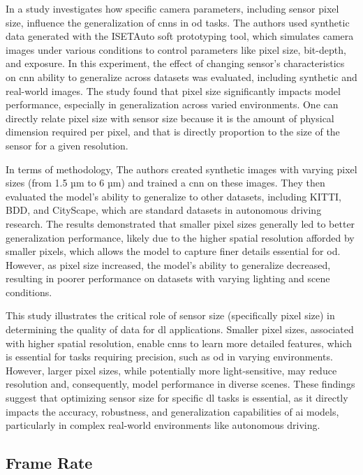 In a study \cite{Sensor_size} investigates how specific camera parameters, including sensor pixel size, influence the generalization of \gls{cnn}s in \gls{od} tasks. The authors used synthetic data generated with the ISETAuto soft prototyping tool, which simulates camera images under various conditions to control parameters like pixel size, bit-depth, and exposure. In this experiment, the effect of changing sensor's characteristics on \gls{cnn} ability to generalize across datasets was evaluated, including synthetic and real-world images. The study found that pixel size significantly impacts model performance, especially in generalization across varied environments. One can directly relate pixel size with sensor size because it is the amount of physical dimension required per pixel, and that is directly proportion to the size of the sensor for a given resolution.

In terms of methodology, The authors created synthetic images with varying pixel sizes (from 1.5 µm to 6 µm) and trained a \gls{cnn} on these images. They then evaluated the model’s ability to generalize to other datasets, including KITTI, BDD, and CityScape, which are standard datasets in autonomous driving research. The results demonstrated that smaller pixel sizes generally led to better generalization performance, likely due to the higher spatial resolution afforded by smaller pixels, which allows the model to capture finer details essential for \gls{od}. However, as pixel size increased, the model’s ability to generalize decreased, resulting in poorer performance on datasets with varying lighting and scene conditions.

This study illustrates the critical role of sensor size (specifically pixel size) in determining the quality of data for \gls{dl} applications. Smaller pixel sizes, associated with higher spatial resolution, enable \gls{cnn}s to learn more detailed features, which is essential for tasks requiring precision, such as \gls{od} in varying environments. However, larger pixel sizes, while potentially more light-sensitive, may reduce resolution and, consequently, model performance in diverse scenes. These findings suggest that optimizing sensor size for specific \gls{dl} tasks is essential, as it directly impacts the accuracy, robustness, and generalization capabilities of \gls{ai} models, particularly in complex real-world environments like autonomous driving.

\subsection{Frame Rate}

